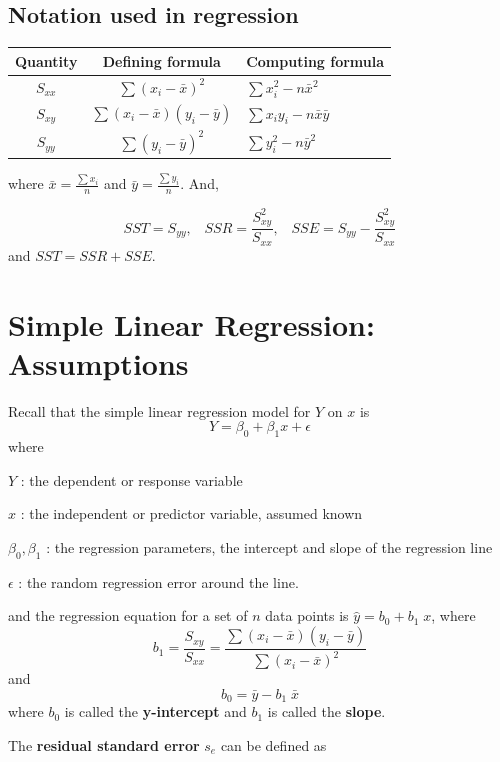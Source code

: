 \documentclass[
]{article}
\begin{document}
\hypertarget{notation-used-in-regression-1}{%
\subsection{Notation used in
regression}\label{notation-used-in-regression-1}}

\begin{longtable}[]{@{}ccl@{}}
\toprule\noalign{}
Quantity & Defining formula & Computing formula \\
\midrule\noalign{}
\endhead
\bottomrule\noalign{}
\endlastfoot
\(S_{xx}\) & \(\sum (x_i-\bar{x})^2\) & \(\sum x^2_i - n \bar{x}^2\) \\
\(S_{xy}\) & \(\sum (x_i-\bar{x})(y_i-\bar{y})\) &
\(\sum x_i y_i - n \bar{x}\bar{y}\) \\
\(S_{yy}\) & \(\sum (y_i-\bar{y})^2\) & \(\sum y^2_i - n \bar{y}^2\) \\
\end{longtable}

where \(\bar{x}=\frac{\sum x_i}{n}\) and \(\bar{y}=\frac{\sum y_i}{n}\).
And,

\[SST=S_{yy},\;\;\; SSR=\frac{S^2_{xy}}{S_{xx}},\;\;\; SSE=S_{yy}-\frac{S^2_{xy}}{S_{xx}} \]
and \(SST=SSR+SSE\).

\hypertarget{simple-linear-regression-assumptions}{%
\section{Simple Linear Regression:
Assumptions}\label{simple-linear-regression-assumptions}}

Recall that the simple linear regression model for \(Y\) on \(x\) is
\[Y=\beta_0+\beta_1 x+\epsilon\] where

\(Y\) : the dependent or response variable

\(x\) : the independent or predictor variable, assumed known

\(\beta_0,\beta_1\) : the regression parameters, the intercept and slope
of the regression line

\(\epsilon\) : the random regression error around the line.

and the regression equation for a set of \(n\) data points is
\(\hat{y}=b_0+b_1\;x\), where
\[b_1=\frac{S_{xy}}{S_{xx}}=\frac{\sum (x_i-\bar{x})(y_i-\bar{y})}{\sum (x_i-\bar{x})^2}\]
and \[b_0=\bar{y}-b_1\; \bar{x}\] where \(b_0\) is called the
\textbf{y-intercept} and \(b_1\) is called the \textbf{slope}.

The \textbf{residual standard error} \(s_e\) can be defined as
\end{document}
